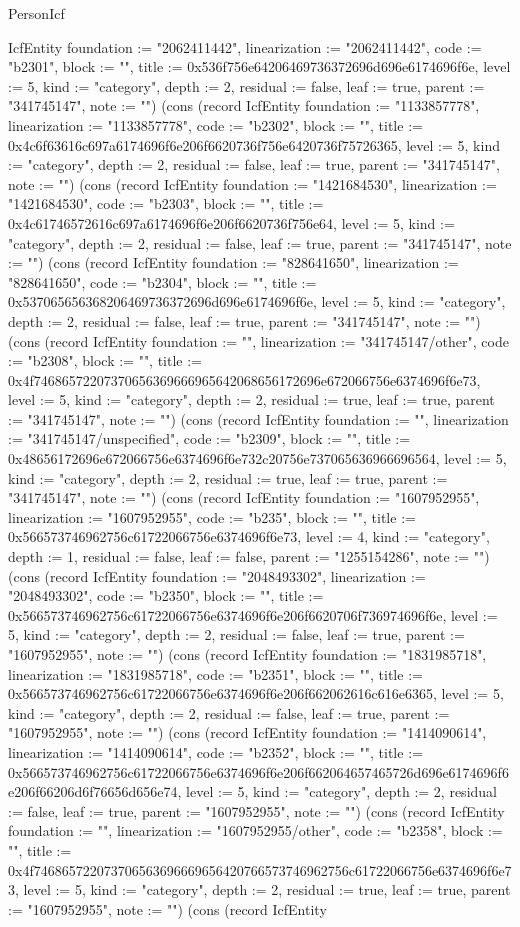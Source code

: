 \begin{lexlean}{PersonIcf}
\begin{semanticmodule}
{IcfEntity {foundation := "2062411442", linearization := "2062411442", code := "b2301", block := "", title := 0x536f756e64206469736372696d696e6174696f6e, level := 5, kind := "category", depth := 2, residual := false, leaf := true, parent := "341745147", note := ""}) (cons (record IcfEntity {foundation := "1133857778", linearization := "1133857778", code := "b2302", block := "", title := 0x4c6f63616c697a6174696f6e206f6620736f756e6420736f75726365, level := 5, kind := "category", depth := 2, residual := false, leaf := true, parent := "341745147", note := ""}) (cons (record IcfEntity {foundation := "1421684530", linearization := "1421684530", code := "b2303", block := "", title := 0x4c61746572616c697a6174696f6e206f6620736f756e64, level := 5, kind := "category", depth := 2, residual := false, leaf := true, parent := "341745147", note := ""}) (cons (record IcfEntity {foundation := "828641650", linearization := "828641650", code := "b2304", block := "", title := 0x537065656368206469736372696d696e6174696f6e, level := 5, kind := "category", depth := 2, residual := false, leaf := true, parent := "341745147", note := ""}) (cons (record IcfEntity {foundation := "", linearization := "341745147/other", code := "b2308", block := "", title := 0x4f74686572207370656369666965642068656172696e672066756e6374696f6e73, level := 5, kind := "category", depth := 2, residual := true, leaf := true, parent := "341745147", note := ""}) (cons (record IcfEntity {foundation := "", linearization := "341745147/unspecified", code := "b2309", block := "", title := 0x48656172696e672066756e6374696f6e732c20756e737065636966696564, level := 5, kind := "category", depth := 2, residual := true, leaf := true, parent := "341745147", note := ""}) (cons (record IcfEntity {foundation := "1607952955", linearization := "1607952955", code := "b235", block := "", title := 0x566573746962756c61722066756e6374696f6e73, level := 4, kind := "category", depth := 1, residual := false, leaf := false, parent := "1255154286", note := ""}) (cons (record IcfEntity {foundation := "2048493302", linearization := "2048493302", code := "b2350", block := "", title := 0x566573746962756c61722066756e6374696f6e206f6620706f736974696f6e, level := 5, kind := "category", depth := 2, residual := false, leaf := true, parent := "1607952955", note := ""}) (cons (record IcfEntity {foundation := "1831985718", linearization := "1831985718", code := "b2351", block := "", title := 0x566573746962756c61722066756e6374696f6e206f662062616c616e6365, level := 5, kind := "category", depth := 2, residual := false, leaf := true, parent := "1607952955", note := ""}) (cons (record IcfEntity {foundation := "1414090614", linearization := "1414090614", code := "b2352", block := "", title := 0x566573746962756c61722066756e6374696f6e206f662064657465726d696e6174696f6e206f66206d6f76656d656e74, level := 5, kind := "category", depth := 2, residual := false, leaf := true, parent := "1607952955", note := ""}) (cons (record IcfEntity {foundation := "", linearization := "1607952955/other", code := "b2358", block := "", title := 0x4f746865722073706563696669656420766573746962756c61722066756e6374696f6e73, level := 5, kind := "category", depth := 2, residual := true, leaf := true, parent := "1607952955", note := ""}) (cons (record IcfEntity }
\end{semanticmodule}
\end{lexlean}
